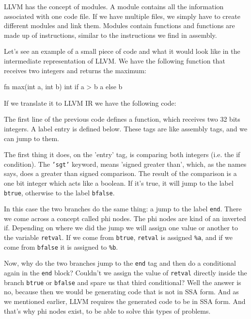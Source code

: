 ﻿\documentclass[10pt,a4paper,twocolumn,twoside]{article}
\begin{document}
LLVM has the concept of modules. A module contains all the information
associated with one code file. If we have multiple files, we simply have to
create different modules and link them. Modules contain functions and functions
are made up of instructions, similar to the instructions we find in assembly.

Let's see an example of a small piece of code and what it would look like in the
intermediate representation of LLVM. We have the following function that
receives two integers and returns the maximum:

\begin{code}
fn max(int a, int b) int {
    if a > b { a } else { b }
}
\end{code}

If we translate it to LLVM IR we have the following code:


The first line of the previous code defines a function, which receives two
32 bits integers. A label entry is defined below. These tags are like assembly
tags, and we can jump to them.

The first thing it does, on the 'entry' tag, is comparing both integers (i.e.
the if condition). The \texttt{'sgt'} keyword, means 'signed greater than',
which, as the names says, does a greater than signed comparison. The result of
the comparison is a one bit integer which acts like a boolean. If it's true, it
will jump to the label \texttt{btrue}, otherwise to the label \texttt{bfalse}.

In this case the two branches do the same thing: a jump to the label
\texttt{end}. There we come across a concept called phi nodes. The phi nodes
are kind of an inverted if. Depending on where we did the jump we will assign
one value or another to the variable \texttt{retval}. If we come from
\texttt{btrue}, \texttt{retval} is assigned \texttt{\%a}, and if we come from 
\texttt{bfalse} it is assigned to \texttt{\%b}.

Now, why do the two branches jump to the \texttt{end} tag and then do a
conditional again in the \texttt{end} block? Couldn't we assign the value of
\texttt{retval} directly inside the branch \texttt{btrue} or \texttt{bfalse} and
spare us that third conditional? Well the answer is no, because then we would be
generating code that is not in SSA form. And as we mentioned earlier, LLVM
requires the generated code to be in SSA form. And that's why phi nodes exist,
to be able to solve this types of problems.
\end{document}
